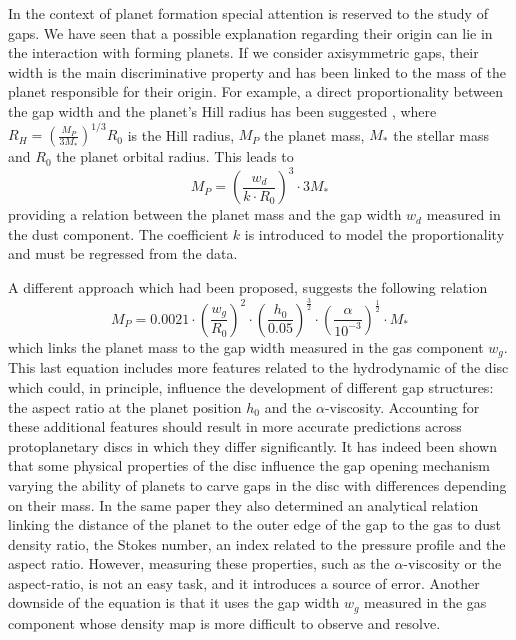 \documentclass[a4paper,10pt]{report}
\begin{document}
In the context of planet formation special attention is reserved to the study of gaps. 
We have seen that a possible explanation regarding their origin can lie in the interaction with
forming planets. If we consider axisymmetric gaps, their width is the main discriminative property and
has been linked to the mass of the planet responsible for their origin.
For example, a direct proportionality between the gap width and the planet's Hill radius has been suggested \citep{Lodato_2019}, where
$
    R_H = (\frac{M_P}{3M_*})^{1/3}R_0
$
is the Hill radius, $M_P$ the planet mass, $M_*$ the stellar mass and $R_0$ the planet orbital radius.
This leads to 
\begin{equation}
    M_P = (\frac{w_d}{k\cdot R_0})^3\cdot 3M_*
\end{equation}
providing a relation between the planet mass and the gap width $w_d$ measured in the dust component.
The coefficient $k$ is introduced to model the proportionality and must be regressed from the data.

A different approach which had been proposed, \citet{kanagawa} suggests the following relation
\begin{equation}
    M_P = 0.0021 \cdot \left( \frac{w_g}{R_0}\right)^2
    \cdot \left(\frac{h_0}{0.05}\right)^{\frac 32}
    \cdot \left(\frac{\alpha}{10^{-3}}\right)^{\frac 12}
    \cdot M_*
\end{equation}
which links the planet mass to the gap width measured in the gas component $w_g$.
This last equation includes more features related to the hydrodynamic of the disc which could, in principle,
influence the development of different gap structures: the aspect ratio at the planet position
$h_0$ and the $\alpha$-viscosity. Accounting for these additional features should result in more accurate predictions
across protoplanetary discs in which they differ significantly. It has indeed been shown
\citep{Dipierro_2017} that some physical properties of the disc 
 influence the gap opening mechanism varying the ability of planets to carve gaps
 in the disc with differences depending on their mass. In the same paper they also 
 determined an analytical relation linking the distance of the planet to the outer edge of the gap
 to the gas to dust density ratio, the Stokes number, an index related to the pressure profile and the aspect ratio. 
 However, measuring these properties, such as the $\alpha$-viscosity or the aspect-ratio,
is not an easy task, and it introduces a source of error.
Another downside of the \citet{kanagawa} equation is that it uses the gap width $w_g$ measured in the gas component 
whose density map is more difficult to observe and resolve.
\end{document}
